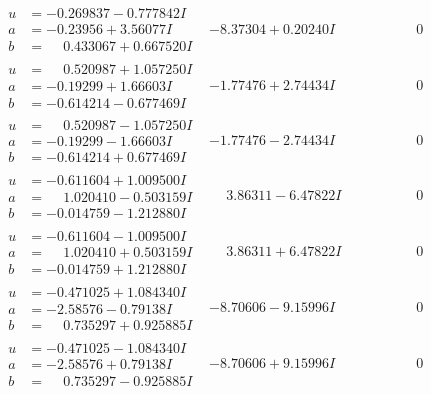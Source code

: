 \documentclass[1p]{elsarticle_modified}
\theoremstyle{definition}
\begin{document}
$$\begin{array}{c|c|c}
\begin{aligned}
u &= -0.269837 - 0.777842 I \\
a &= -0.23956 + 3.56077 I \\
b &= \phantom{-}0.433067 + 0.667520 I\end{aligned}
 & -8.37304 + 0.20240 I & \phantom{-0.000000 } 0 \\ \hline\begin{aligned}
u &= \phantom{-}0.520987 + 1.057250 I \\
a &= -0.19299 + 1.66603 I \\
b &= -0.614214 - 0.677469 I\end{aligned}
 & -1.77476 + 2.74434 I & \phantom{-0.000000 } 0 \\ \hline\begin{aligned}
u &= \phantom{-}0.520987 - 1.057250 I \\
a &= -0.19299 - 1.66603 I \\
b &= -0.614214 + 0.677469 I\end{aligned}
 & -1.77476 - 2.74434 I & \phantom{-0.000000 } 0 \\ \hline\begin{aligned}
u &= -0.611604 + 1.009500 I \\
a &= \phantom{-}1.020410 - 0.503159 I \\
b &= -0.014759 - 1.212880 I\end{aligned}
 & \phantom{-}3.86311 - 6.47822 I & \phantom{-0.000000 } 0 \\ \hline\begin{aligned}
u &= -0.611604 - 1.009500 I \\
a &= \phantom{-}1.020410 + 0.503159 I \\
b &= -0.014759 + 1.212880 I\end{aligned}
 & \phantom{-}3.86311 + 6.47822 I & \phantom{-0.000000 } 0 \\ \hline\begin{aligned}
u &= -0.471025 + 1.084340 I \\
a &= -2.58576 - 0.79138 I \\
b &= \phantom{-}0.735297 + 0.925885 I\end{aligned}
 & -8.70606 - 9.15996 I & \phantom{-0.000000 } 0 \\ \hline\begin{aligned}
u &= -0.471025 - 1.084340 I \\
a &= -2.58576 + 0.79138 I \\
b &= \phantom{-}0.735297 - 0.925885 I\end{aligned}
 & -8.70606 + 9.15996 I & \phantom{-0.000000 } 0\\

\end{array}$$
\end{document}
